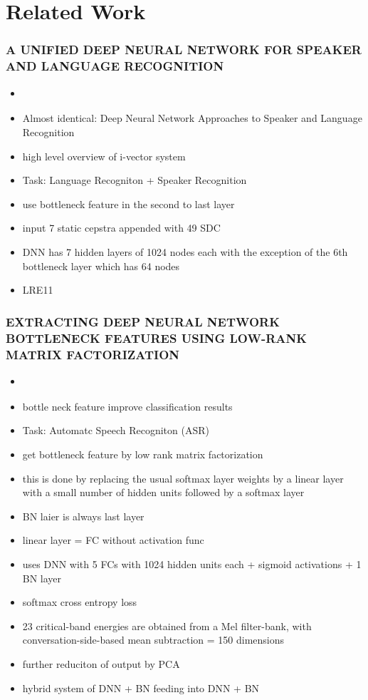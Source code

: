 \section{Related Work}
\label{sec:related_work}

    \subsubsection{A UNIFIED DEEP NEURAL NETWORK FOR SPEAKER AND LANGUAGE RECOGNITION}
    \begin{itemize}
        \item \cite{richardson2015unified}
        \item Almost identical: Deep Neural Network Approaches to Speaker and Language Recognition \cite{richardson2015deep}
        \item high level overview of i-vector system
        \item Task: Language Recogniton + Speaker Recognition
        \item use bottleneck feature in the second to last layer
        \item input 7 static cepstra appended with 49 SDC
        \item DNN has 7 hidden layers of 1024 nodes each with the exception of the 6th bottleneck layer which has 64 nodes
        \item LRE11
    \end{itemize}
    
    \subsubsection{EXTRACTING DEEP NEURAL NETWORK BOTTLENECK FEATURES USING LOW-RANK MATRIX FACTORIZATION
    }
    \begin{itemize}
        \item \cite{zhang2014extracting}
        \item bottle neck feature improve classification results
        \item Task: Automatc Speech Recogniton (ASR)
        \item get bottleneck feature by low rank matrix factorization
        \item this is done by replacing the usual softmax layer weights by a linear layer with a small number of hidden units followed by a softmax layer
        \item BN laier is always last layer
        \item linear layer = FC without activation func
        \item uses DNN with 5 FCs with 1024 hidden units each + sigmoid activations + 1 BN layer
        \item softmax cross entropy loss 
        \item 23 critical-band energies are obtained from a Mel filter-bank, with conversation-side-based mean subtraction = 150 dimensions
        \item further reduciton of output by PCA
        \item hybrid system of DNN + BN feeding into DNN + BN
        
    \end{itemize}

